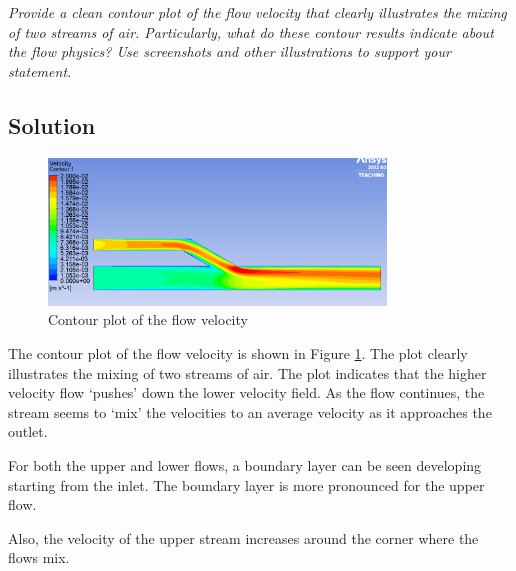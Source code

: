 \section{}
\textit{Provide a clean contour plot of the flow velocity that clearly illustrates the mixing of two
streams of air. Particularly, what do these contour results indicate about the flow physics?
Use screenshots and other illustrations to support your statement.}

\subsection*{Solution}
\begin{figure}[h]
    \centering
    \includegraphics[width=0.8\textwidth]{Questions/Figures/velocity contour.png}
    \caption{Contour plot of the flow velocity}
    \label{fig:contour}
\end{figure}

The contour plot of the flow velocity is shown in Figure \ref{fig:contour}. The plot clearly illustrates the mixing of two streams of air. The plot indicates that the higher velocity flow `pushes' down the lower velocity field. As the flow continues, the stream seems to `mix' the velocities to an average velocity as it approaches the outlet. 

For both the upper and lower flows, a boundary layer can be seen developing starting from the inlet. The boundary layer is more pronounced for the upper flow. 

Also, the velocity of the upper stream increases around the corner where the flows mix.